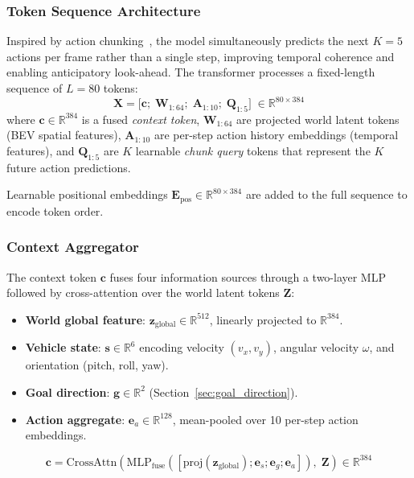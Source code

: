 \documentclass[sensors,article,submit,pdftex,moreauthors]{Definitions/mdpi}
\begin{document}
\subsubsection{Token Sequence Architecture}
Inspired by action chunking~\cite{zhao2023act}, the model simultaneously predicts the next $K{=}5$ actions per frame rather than a single step, improving temporal coherence and enabling anticipatory look-ahead. The transformer processes a fixed-length sequence of $L{=}80$ tokens:
\begin{equation}
    \mathbf{X} = \bigl[\mathbf{c};\;\mathbf{W}_{1:64};\;\mathbf{A}_{1:10};\;\mathbf{Q}_{1:5}\bigr]
    \;\in \mathbb{R}^{80 \times 384}
\end{equation}
where $\mathbf{c} \in \mathbb{R}^{384}$ is a fused \emph{context token}, $\mathbf{W}_{1:64}$ are projected world latent tokens (BEV spatial features), $\mathbf{A}_{1:10}$ are per-step action history embeddings (temporal features), and $\mathbf{Q}_{1:5}$ are $K$ learnable \emph{chunk query} tokens that represent the $K$ future action predictions.

Learnable positional embeddings $\mathbf{E}_\text{pos} \in \mathbb{R}^{80 \times 384}$ are added to the full sequence to encode token order.

\subsubsection{Context Aggregator}
The context token $\mathbf{c}$ fuses four information sources through a two-layer MLP followed by cross-attention over the world latent tokens $\mathbf{Z}$:
\begin{itemize}
    \item \textbf{World global feature}: $\mathbf{z}_\text{global} \in \mathbb{R}^{512}$, linearly projected to $\mathbb{R}^{384}$.
    \item \textbf{Vehicle state}: $\mathbf{s} \in \mathbb{R}^{6}$ encoding velocity $(v_x, v_y)$, angular velocity $\omega$, and orientation (pitch, roll, yaw).
    \item \textbf{Goal direction}: $\mathbf{g} \in \mathbb{R}^{2}$ (Section~\ref{sec:goal_direction}).
    \item \textbf{Action aggregate}: $\mathbf{e}_a \in \mathbb{R}^{128}$, mean-pooled over 10 per-step action embeddings.
\end{itemize}
\begin{equation}
    \mathbf{c} = \text{CrossAttn}\!\left(\text{MLP}_\text{fuse}([\text{proj}(\mathbf{z}_\text{global}); \mathbf{e}_s; \mathbf{e}_g; \mathbf{e}_a]),\;\mathbf{Z}\right) \in \mathbb{R}^{384}
\end{equation}
\end{document}
